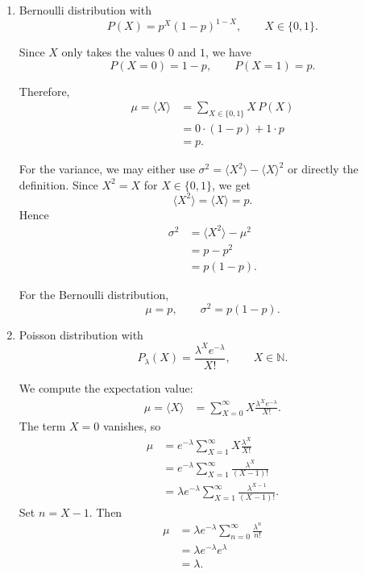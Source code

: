 \documentclass[11pt,a4paper]{scrartcl}
\newcommand{\N}{\mathbb{N}}
\begin{document}
\begin{enumerate}[label=(\alph*)]
    \item Bernoulli distribution with
    \[
    P(X)=p^X(1-p)^{1-X}, \qquad X\in\{0,1\}.
    \]

    \begin{calculationbox}
    Since $X$ only takes the values $0$ and $1$, we have
    \[
    P(X=0)=1-p, \qquad P(X=1)=p.
    \]

    Therefore,
    \begin{align*}
        \mu=\langle X\rangle
        &= \sum_{X\in\{0,1\}} X\,P(X) \\
        &= 0\cdot(1-p)+1\cdot p \\
        &= p.
    \end{align*}

    For the variance, we may either use $\sigma^2=\langle X^2\rangle-\langle X\rangle^2$ or directly the definition.
    Since $X^2=X$ for $X\in\{0,1\}$, we get
    \[
    \langle X^2\rangle=\langle X\rangle=p.
    \]
    Hence
    \begin{align*}
        \sigma^2
        &= \langle X^2\rangle-\mu^2 \\
        &= p-p^2 \\
        &= p(1-p).
    \end{align*}
    \end{calculationbox}

    \begin{answerbox}
    For the Bernoulli distribution,
    \[
    \boxed{\mu=p, \qquad \sigma^2=p(1-p).}
    \]
    \end{answerbox}

    \item Poisson distribution with
    \[
    P_\lambda(X)=\frac{\lambda^X e^{-\lambda}}{X!}, \qquad X\in\N.
    \]

    \begin{calculationbox}
    We compute the expectation value:
    \begin{align*}
        \mu=\langle X\rangle
        &= \sum_{X=0}^\infty X \frac{\lambda^X e^{-\lambda}}{X!}.
    \end{align*}
    The term $X=0$ vanishes, so
    \begin{align*}
        \mu
        &= e^{-\lambda}\sum_{X=1}^\infty X\frac{\lambda^X}{X!} \\
        &= e^{-\lambda}\sum_{X=1}^\infty \frac{\lambda^X}{(X-1)!} \\
        &= \lambda e^{-\lambda}\sum_{X=1}^\infty \frac{\lambda^{X-1}}{(X-1)!}.
    \end{align*}
    Set $n=X-1$. Then
    \begin{align*}
        \mu
        &= \lambda e^{-\lambda}\sum_{n=0}^\infty \frac{\lambda^n}{n!} \\
        &= \lambda e^{-\lambda} e^\lambda \\
        &= \lambda.
    \end{align*}


\end{calculationbox}
\end{enumerate}
\end{document}
